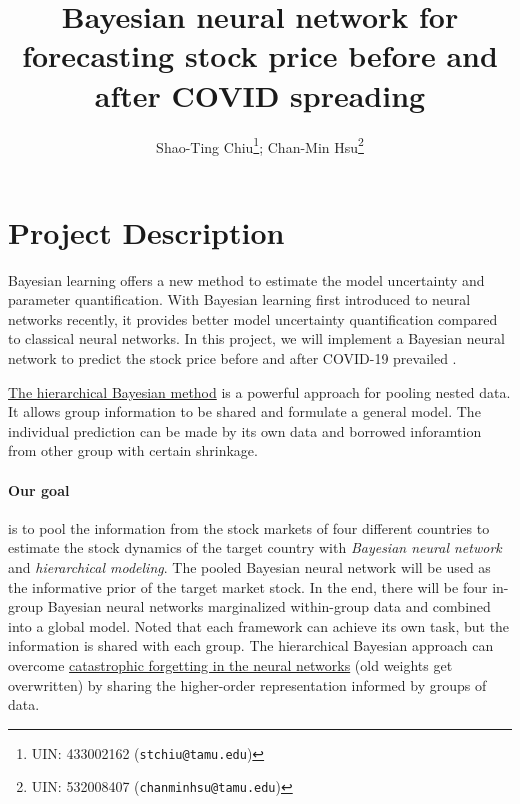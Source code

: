 \documentclass[a4paper]{article}
\title{Bayesian neural network for forecasting stock price before and after COVID spreading}
\author{%
  Shao-Ting Chiu\thanks{UIN: 433002162 (\texttt{stchiu@tamu.edu})}; 
  Chan-Min Hsu\thanks{UIN: 532008407 (\texttt{chanminhsu@tamu.edu})}
}
\begin{document}
\maketitle


\section{Project Description}




Bayesian learning offers a new method to estimate the model uncertainty and parameter quantification. With Bayesian learning first introduced to neural networks recently, it provides better model uncertainty quantification compared to classical neural networks. In this project, we will implement a Bayesian neural network to predict the stock price before and after COVID-19 prevailed \cite{chandra2021bayesian}. 



\href{https://twiecki.io/blog/2018/08/13/hierarchical_bayesian_neural_network/}{The hierarchical Bayesian method} is a powerful approach for pooling nested data. It allows group information to be shared and formulate a general model. The individual prediction can be made by its own data and borrowed inforamtion from other group with certain shrinkage.

\paragraph{Our goal} is to pool the information from the stock markets of four different countries to estimate the stock dynamics of the target country with \textit{Bayesian neural network} and \textit{hierarchical modeling}. The pooled Bayesian neural network will be used as the informative prior of the target market stock. In the end, there will be four in-group Bayesian neural networks marginalized within-group data and combined into a global model. Noted that each framework can achieve its own task, but the information is shared with each group. The hierarchical Bayesian approach can overcome \href{https://www.pnas.org/doi/10.1073/pnas.1611835114#sec-3}{catastrophic forgetting in the neural networks} (old weights get overwritten) by sharing the higher-order representation informed by groups of data.
\end{document}

